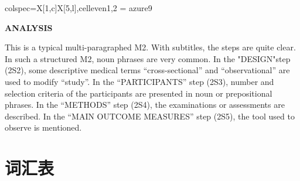 \documentclass[a4paper]{ctexbook}
\begin{document}
\begin{sample}[label={myautocounter}]{\heiti}
{\begin{tblr}{colspec={X[1,c]X[5,l]},cell{even}{1,2} = {azure9}}
    \bottomrule
  \end{tblr}
  }


  \noindent \textbf{ANALYSIS}

  This is a typical multi-paragraphed M2. With subtitles, the steps are quite clear. In such a structured M2, noun phrases are very common. In the "DESIGN"step (2S2), some descriptive medical terms ``cross-sectional'' and ``observational'' are used to modify ``study''. In the ``PARTICIPANTS'' step (2S3), number and selection criteria of the participants are presented in noun or prepositional phrases. In the ``METHODS'' step (2S4), the examinations or assessments are described. In the ``MAIN OUTCOME MEASURES'' step (2S5), the tool used to observe is mentioned.

\end{sample}

\section{词汇表}
\end{document}
